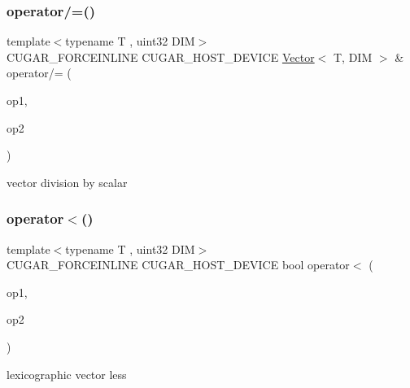 \subsubsection{\texorpdfstring{operator/=()}{operator/=()}\hspace{0.1cm}{\footnotesize\ttfamily [2/2]}}
{\footnotesize\ttfamily template$<$typename T , uint32 D\+IM$>$ \\
C\+U\+G\+A\+R\+\_\+\+F\+O\+R\+C\+E\+I\+N\+L\+I\+NE C\+U\+G\+A\+R\+\_\+\+H\+O\+S\+T\+\_\+\+D\+E\+V\+I\+CE \hyperlink{structcugar_1_1_vector}{Vector}$<$ T, D\+IM $>$ \& operator/= (\begin{DoxyParamCaption}\item[{\hyperlink{structcugar_1_1_vector}{Vector}$<$ T, D\+IM $>$ \&}]{op1,  }\item[{const T}]{op2 }\end{DoxyParamCaption})\hspace{0.3cm}{\ttfamily [related]}}

vector division by scalar \mbox{\label{group___vectors_module_ga2f4af808d98e230aa470de34594eb210}} 
\subsubsection{\texorpdfstring{operator$<$()}{operator<()}}
{\footnotesize\ttfamily template$<$typename T , uint32 D\+IM$>$ \\
C\+U\+G\+A\+R\+\_\+\+F\+O\+R\+C\+E\+I\+N\+L\+I\+NE C\+U\+G\+A\+R\+\_\+\+H\+O\+S\+T\+\_\+\+D\+E\+V\+I\+CE bool operator$<$ (\begin{DoxyParamCaption}\item[{const \hyperlink{structcugar_1_1_vector}{Vector}$<$ T, D\+IM $>$ \&}]{op1,  }\item[{const \hyperlink{structcugar_1_1_vector}{Vector}$<$ T, D\+IM $>$ \&}]{op2 }\end{DoxyParamCaption})\hspace{0.3cm}{\ttfamily [related]}}

lexicographic vector less \mbox{\label{group___vectors_module_ga17776186977d2759c2ee3ea8f9ddce77}} 
